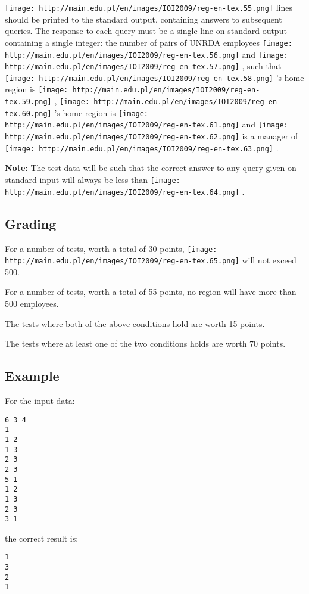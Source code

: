 \texttt{[image: http://main.edu.pl/en/images/IOI2009/reg-en-tex.55.png]}   lines should be printed to the standard output, containing answers to  subsequent queries.   The response to each query must be a single line  on standard output containing a single integer: the number of pairs of  UNRDA employees   
\texttt{[image: http://main.edu.pl/en/images/IOI2009/reg-en-tex.56.png]}   and   
\texttt{[image: http://main.edu.pl/en/images/IOI2009/reg-en-tex.57.png]}   , such that   
\texttt{[image: http://main.edu.pl/en/images/IOI2009/reg-en-tex.58.png]}   's home region is   
\texttt{[image: http://main.edu.pl/en/images/IOI2009/reg-en-tex.59.png]}   ,   
\texttt{[image: http://main.edu.pl/en/images/IOI2009/reg-en-tex.60.png]}   's home region is   
\texttt{[image: http://main.edu.pl/en/images/IOI2009/reg-en-tex.61.png]}   and   
\texttt{[image: http://main.edu.pl/en/images/IOI2009/reg-en-tex.62.png]}   is a manager of   
\texttt{[image: http://main.edu.pl/en/images/IOI2009/reg-en-tex.63.png]}   .  

\textbf{    Note:   }   The test data will be such that the correct answer to any query given on standard input will always be less than   
\texttt{[image: http://main.edu.pl/en/images/IOI2009/reg-en-tex.64.png]}   .  

\subsection{   Grading  }

   For a number of tests, worth a total of 30 points,   
\texttt{[image: http://main.edu.pl/en/images/IOI2009/reg-en-tex.65.png]}   will not exceed 500.   


   For a number of tests, worth a total of 55 points, no region will have more than 500 employees.   


   The tests where both of the above conditions hold are worth 15 points.   


   The tests where at least one of the two conditions holds are worth 70 points.  

\subsection{   Example  }

   For the input data:  
\begin{verbatim}
6 3 4
1
1 2
1 3
2 3
2 3
5 1
1 2
1 3
2 3
3 1
\end{verbatim}

   the correct result is:  
\begin{verbatim}
1
3
2
1
\end{verbatim}
